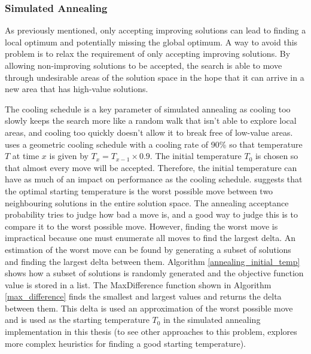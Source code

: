 \subsubsection{Simulated Annealing} \label{simulated_annealing}

As previously mentioned, only accepting improving solutions can lead to finding a local optimum and potentially missing the global optimum. A way to avoid this problem is to relax the requirement of only accepting improving solutions. By allowing non-improving solutions to be accepted, the search is able to move through undesirable areas of the solution space in the hope that it can arrive in a new area that has high-value solutions.

The cooling schedule is a key parameter of simulated annealing as cooling too slowly keeps the search more like a random walk that isn't able to explore local areas, and cooling too quickly doesn't allow it to break free of low-value areas. \citet{kirkpatrick1983optimization} uses a geometric cooling schedule with a cooling rate of 90\% so that temperature $T$ at time $x$ is given by $T_x = T_{x-1} \times 0.9$. The initial temperature $T_0$ is chosen so that almost every move will be accepted. Therefore, the initial temperature can have as much of an impact on performance as the cooling schedule. \citet{kirkpatrick1983optimization} suggests that the optimal starting temperature is the worst possible move between two neighbouring solutions in the entire solution space. The annealing acceptance probability tries to judge how bad a move is, and a good way to judge this is to compare it to the worst possible move. However, finding the worst move is impractical because one must enumerate all moves to find the largest delta. An estimation of the worst move can be found by generating a subset of solutions and finding the largest delta between them. Algorithm \ref{annealing_initial_temp} shows how a subset of solutions is randomly generated and the objective function value is stored in a list. The MaxDifference function shown in Algorithm  \ref{max_difference} finds the smallest and largest values and returns the delta between them. This delta is used an approximation of the worst possible move and is used as the starting temperature $T_0$ in the simulated annealing implementation in this thesis (to see other approaches to this problem, \citet{ben2004computing} explores more complex heuristics for finding a good starting temperature).


